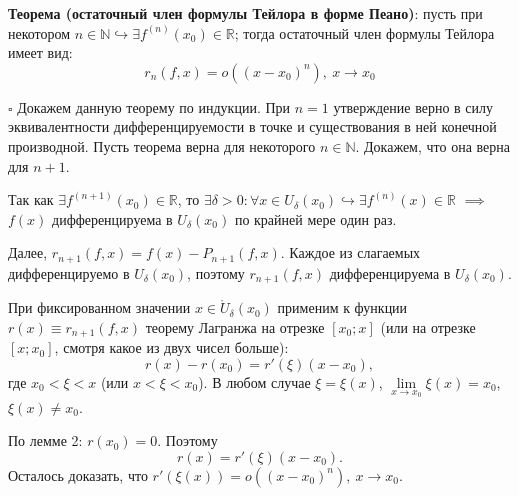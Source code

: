 \documentclass[12pt, a4paper, reqno]{article}
\begin{document}
    \textbf{Теорема (остаточный член формулы Тейлора в форме Пеано)}: пусть при некотором
    $n\in\mathbb{N}\hookrightarrow\exists f^{(n)}(x_0)\in\mathbb{R}$; тогда остаточный член формулы
    Тейлора имеет вид:
    \begin{equation*}
        r_n(f, x) = o((x - x_0)^n),\ x\to x_0
    \end{equation*}

    $\square$ Докажем данную теорему по индукции. При $n = 1$ утверждение верно в силу
    эквивалентности дифференцируемости в точке и существования в ней конечной производной. Пусть
    теорема верна для некоторого $n\in\mathbb{N}$. Докажем, что она верна для $n + 1$.

    Так как $\exists f^{(n + 1)}(x_0)\in\mathbb{R}$, то $\exists\delta > 0: \forall x\in
    U_{\delta}(x_0)\hookrightarrow \exists f^{(n)}(x)\in\mathbb{R}$ $\implies$ $f(x)$
    дифференцируема в $U_{\delta}(x_0)$ по крайней мере один раз.

    Далее, $r_{n + 1}(f, x) = f(x) - P_{n + 1}(f, x)$. Каждое из слагаемых дифференцируемо в
    $U_{\delta}(x_0)$, поэтому $r_{n + 1}(f, x)$ дифференцируема в $U_{\delta}(x_0)$.

    При фиксированном значении $x\in\mathring U_{\delta}(x_0)$ применим к функции $r(x) \equiv
    r_{n + 1}(f, x)$ теорему Лагранжа на отрезке $[x_0; x]$ (или на отрезке $[x; x_0]$, смотря какое
    из двух чисел больше):
    \begin{equation*}
        r(x) - r(x_0) = r'(\xi)(x - x_0),
    \end{equation*}
    где $x_0 < \xi < x$ (или $x < \xi < x_0$). В любом случае $\xi = \xi(x)$,
    $\lim\limits_{x\to x_0} \xi(x) = x_0$, $\xi(x)\neq x_0$.

    По лемме 2: $r(x_0) = 0$. Поэтому
    \begin{equation*}
        r(x) = r'(\xi)(x - x_0).
    \end{equation*}
    Осталось доказать, что $r'(\xi(x)) = o((x - x_0)^n),\ x \to x_0$.
\end{document}
